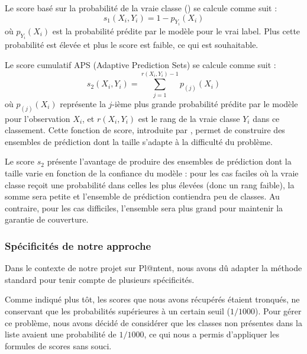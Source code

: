 \documentclass[a4paper,12pt]{article}
\begin{document}
\vspace{0.2cm}

Le score basé sur la probabilité de la vraie classe (\cite{Vovk}) se calcule comme suit : 
$$ s_1(X_i, Y_i) = 1 - p_{Y_i}(X_i) $$ où $p_{Y_i}(X_i)$ est la probabilité prédite par le modèle pour le vrai label. Plus cette probabilité est élevée et plus le score est faible, ce qui est souhaitable.

\vspace{0.2cm}

Le score cumulatif APS (Adaptive Prediction Sets) se calcule comme suit : 
$$ s_2(X_i, Y_i) = \sum_{j=1}^{r(X_i, Y_i)-1} p_{(j)}(X_i) $$ où $p_{(j)}(X_i)$ représente la $j$-ième plus grande probabilité prédite par le modèle pour l'observation $X_i$, et $r(X_i, Y_i)$ est le rang de la vraie classe $Y_i$ dans ce classement. Cette fonction de score, introduite par \cite{Romano}, permet de construire des ensembles de prédiction dont la taille s'adapte à la difficulté du problème.

\vspace{0.2cm}

Le score $s_2$ présente l'avantage de produire des ensembles de prédiction dont la taille varie en fonction de la confiance du modèle : pour les cas faciles où la vraie classe reçoit une probabilité dans celles les plus élevées (donc un rang faible), la somme sera petite et l'ensemble de prédiction contiendra peu de classes. Au contraire, pour les cas difficiles, l'ensemble sera plus grand pour maintenir la garantie de couverture.

\subsubsection{Spécificités de notre approche}

Dans le contexte de notre projet sur Pl@ntent, nous avons dû adapter la méthode standard pour tenir compte de plusieurs spécificités.

\vspace{0.2cm}

Comme indiqué plus tôt, les scores que nous avons récupérés étaient tronqués, ne conservant que les probabilités supérieures à un certain seuil ($1/1000$). Pour gérer ce problème, nous avons décidé de considérer que les classes non présentes dans la liste avaient une probabilité de $1/1000$, ce qui nous a permis d'appliquer les formules de scores sans souci.

\vspace{0.2cm}
\end{document}
